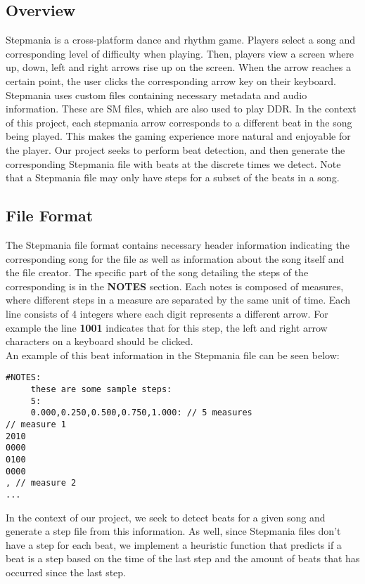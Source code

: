 \subsection{Overview}

Stepmania is a cross-platform dance and rhythm game. Players select a song and corresponding level of difficulty when playing. Then, players view a screen where up, down, left and right arrows rise up on the screen. When the arrow reaches a certain point, the user clicks the corresponding arrow key on their keyboard.\\

Stepmania uses custom files containing necessary metadata and audio information. These are SM files, which are also used to play DDR. In the context of this project, each stepmania arrow corresponds to a different beat in the song being played. This makes the gaming experience more natural and enjoyable for the player. Our project seeks to perform beat detection, and then generate the corresponding Stepmania file with beats at the discrete times we detect. Note that a Stepmania file may only have steps for a subset of the beats in a song.\\

\subsection{File Format}

The Stepmania file format contains necessary header information indicating the corresponding song for the file as well as information about the song itself and the file creator. The specific part of the song detailing the steps of the corresponding is in the \textbf{NOTES} section. Each notes is composed of measures, where different steps in a measure are separated by the same unit of time. Each line consists of 4 integers where each digit represents a different arrow. For example the line \textbf{1001} indicates that for this step, the left and right arrow characters on a keyboard should be clicked.\\

An example of this beat information in the Stepmania file can be seen below:\\
\begin{lstlisting}
#NOTES:
     these are some sample steps:
     5:
     0.000,0.250,0.500,0.750,1.000: // 5 measures
// measure 1
2010
0000
0100
0000
, // measure 2
...
\end{lstlisting}

In the context of our project, we seek to detect beats for a given song and generate a step file from this information. As well, since Stepmania files don't have a step for each beat, we implement a heuristic function that predicts if a beat is a step based on the time of the last step and the amount of beats that has occurred since the last step.\\
